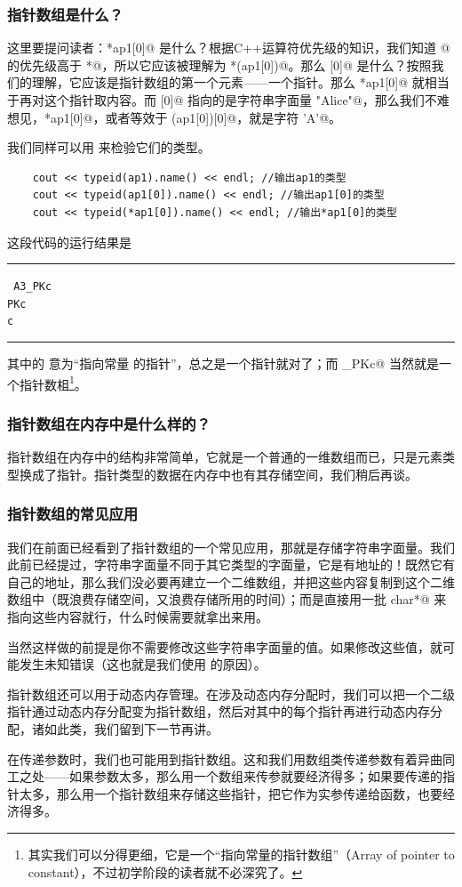 \subsubsection*{指针数组是什么？}
这里要提问读者：\lstinline@*ap1[0]@ 是什么？根据C++运算符优先级的知识，我们知道 \lstinline@[]@ 的优先级高于 \lstinline@*@，所以它应该被理解为 \lstinline@*(ap1[0])@。那么 [0]@ 是什么？按照我们的理解，它应该是指针数组的第一个元素——一个指针。那么 \lstinline@*ap1[0]@ 就相当于再对这个指针取内容。而 [0]@ 指向的是字符串字面量 \lstinline@"Alice"@，那么我们不难想见，\lstinline@*ap1[0]@，或者等效于 \lstinline@(ap1[0])[0]@，就是字符 \lstinline@'A'@。\par
我们同样可以用 \lstinline@typeid@ 来检验它们的类型。
\begin{lstlisting}
    cout << typeid(ap1).name() << endl; //输出ap1的类型
    cout << typeid(ap1[0]).name() << endl; //输出ap1[0]的类型
    cout << typeid(*ap1[0]).name() << endl; //输出*ap1[0]的类型
\end{lstlisting}
这段代码的运行结果是\\\noindent\rule{\linewidth}{.2pt}\texttt{
A3\_PKc\\
PKc\\
c
}\\\noindent\rule{\linewidth}{.2pt}
其中的 \lstinline@PKc@ 意为``指向常量 \lstinline@char@ 的指针''，总之是一个指针就对了；而 _PKc@ 当然就是一个指针数柤\footnote{其实我们可以分得更细，它是一个``指向常量的指针数组''（Array of pointer to constant），不过初学阶段的读者就不必深究了。}。\par
\subsubsection*{指针数组在内存中是什么样的？}
指针数组在内存中的结构非常简单，它就是一个普通的一维数组而已，只是元素类型换成了指针。指针类型的数据在内存中也有其存储空间，我们稍后再谈。\par
\subsubsection*{指针数组的常见应用}
我们在前面已经看到了指针数组的一个常见应用，那就是存储字符串字面量。我们此前已经提过，字符串字面量不同于其它类型的字面量，它是有地址的！既然它有自己的地址，那么我们没必要再建立一个二维数组，并把这些内容复制到这个二维数组中（既浪费存储空间，又浪费存储所用的时间）；而是直接用一批 \lstinline@const char*@ 来指向这些内容就行，什么时候需要就拿出来用。\par
当然这样做的前提是你不需要修改这些字符串字面量的值。如果修改这些值，就可能发生未知错误（这也就是我们使用 \lstinline@const@ 的原因）。\par
指针数组还可以用于动态内存管理。在涉及动态内存分配时，我们可以把一个二级指针通过动态内存分配变为指针数组，然后对其中的每个指针再进行动态内存分配，诸如此类，我们留到下一节再讲。\par
在传递参数时，我们也可能用到指针数组。这和我们用数组类传递参数有着异曲同工之处——如果参数太多，那么用一个数组来传参就要经济得多；如果要传递的指针太多，那么用一个指针数组来存储这些指针，把它作为实参传递给函数，也要经济得多。\par

